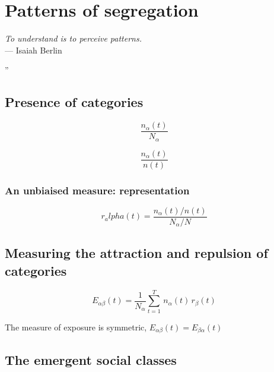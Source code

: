 %
\chapter{Patterns of segregation}
\label{sec:concepts}

\begin{flushright}{\slshape    
To understand is to perceive patterns.} \\ \medskip
--- Isaiah Berlin~\cite{Berlin:2013}
\end{flushright}
”
\bigskip


\section{Presence of categories}
\label{sec:presence_of_categories}

\begin{equation}
    \frac{n_\alpha(t)}{N_\alpha}
\end{equation}


\begin{equation}
    \frac{n_\alpha(t)}{n(t)}
\end{equation}

\subsection{An unbiaised measure: representation}
\label{sub:an_unbiaised_measure_the_representation}

\begin{equation}
    r_alpha(t) = \frac{n_\alpha(t)/n(t)}{N_\alpha/N}
\end{equation}

\section{Measuring the attraction and repulsion of categories}
\label{sec:measuring_the_attraction_and_repulsion_of_categories}

\begin{equation}
    E_{\alpha \beta}(t) = \frac{1}{N_\alpha}
    \sum_{t=1}^T\,n_\alpha(t)\,r_\beta(t) 
\end{equation}

The measure of exposure is symmetric, $E_{\alpha \beta}(t) = E_{\beta \alpha}(t)$

\section{The emergent social classes}
\label{sec:the_emergent_social_classes}



